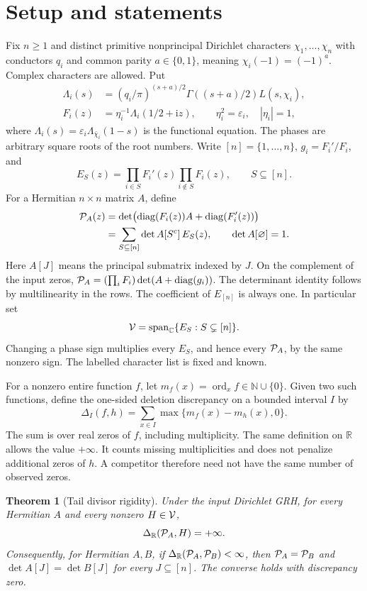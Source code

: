 \documentclass[11pt]{article}
\newtheorem{theorem}{Theorem}[section]
\theoremstyle{definition}\newtheorem{definition}[theorem]{Definition}
\newcommand{\C}{\mathbb C}\newcommand{\R}{\mathbb R}\newcommand{\N}{\mathbb N}
\newcommand{\ii}{\mathrm i}\newcommand{\diag}{\operatorname{diag}}
\newcommand{\ord}{\operatorname{ord}}\newcommand{\Rea}{\operatorname{Re}}\newcommand{\Ima}{\operatorname{Im}}
\begin{document}
\section{Setup and statements}
Fix $n\ge1$ and distinct primitive nonprincipal Dirichlet characters $\chi_1,\ldots,\chi_n$ with conductors $q_i$ and common parity $a\in\{0,1\}$, meaning $\chi_i(-1)=(-1)^a$. Complex characters are allowed. Put
\begin{align*}
 \Lambda_i(s)&=(q_i/\pi)^{(s+a)/2}\Gamma((s+a)/2)L(s,\chi_i),\\
 F_i(z)&=\eta_i^{-1}\Lambda_i(1/2+\ii z),\qquad \eta_i^2=\varepsilon_i,\quad |\eta_i|=1,
\end{align*}
where $\Lambda_i(s)=\varepsilon_i\Lambda_{\bar\chi_i}(1-s)$ is the functional equation. The phases are arbitrary square roots of the root numbers. Write $[n]=\{1,\dots,n\}$, $g_i=F_i'/F_i$, and
\begin{equation}\label{eq:basis}
 E_S(z)=\prod_{i\in S}F_i'(z)\prod_{i\notin S}F_i(z),\qquad S\subseteq[n].
\end{equation}
For a Hermitian $n\times n$ matrix $A$, define
\begin{align}
 \Pcal_A(z)&=\det\bigl(\diag(F_i(z))A+\diag(F_i'(z))\bigr)\notag\\
 &=\sum_{S\subseteq[n]}\det A[S^c]\,E_S(z),\label{eq:det}\qquad \det A[\varnothing]=1.
\end{align}
Here $A[J]$ means the principal submatrix indexed by $J$. On the complement of the input zeros, $\Pcal_A=(\prod_iF_i)\det(A+\diag(g_i))$. The determinant identity follows by multilinearity in the rows. The coefficient of $E_{[n]}$ is always one. In particular set
\[
 \V=\operatorname{span}_{\C}\{E_S:S\subsetneq[n]\}.
\]
Changing a phase sign multiplies every $E_S$, and hence every $\mathcal P_A$, by the same nonzero sign. The labelled character list is fixed and known.

For a nonzero entire function $f$, let $m_f(x)=\ord_x f\in\N\cup\{0\}$. Given two such functions, define the one-sided deletion discrepancy on a bounded interval $I$ by
\[
 \Delta_I(f,h)=\sum_{x\in I}\max\{m_f(x)-m_h(x),0\}.
\]
The sum is over real zeros of $f$, including multiplicity. The same definition on $\R$ allows the value $+\infty$. It counts missing multiplicities and does not penalize additional zeros of $h$. A competitor therefore need not have the same number of observed zeros.

\begin{theorem}[Tail divisor rigidity]\label{thm:tail}
Under the input Dirichlet GRH, for every Hermitian $A$ and every nonzero $H\in\mathcal V$,
\[
                 \Delta_{\R}(\Pcal_A,H)=+\infty.
\]
Consequently, for Hermitian $A,B$, if $\Delta_{\R}(\Pcal_A,\Pcal_B)<\infty$, then $\mathcal P_A=\mathcal P_B$ and $\det A[J]=\det B[J]$ for every $J\subseteq[n]$. The converse holds with discrepancy zero.
\end{theorem}
\end{document}
